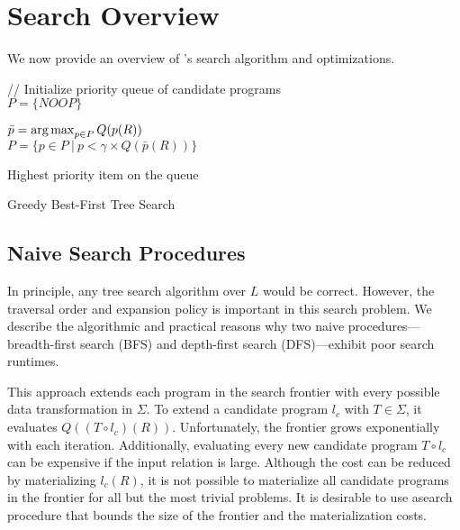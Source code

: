 \section{Search Overview}
We now provide an overview of \sys's search algorithm and optimizations.


{
\begin{algorithm}[t]

// Initialize priority queue of candidate programs\\
$P = \{NOOP\}$

{
    
    $\bar{p} = \operatorname*{arg\,max}_{p\in P} Q(p(R))$\\
    $P = \{p \in P\ |\ p < \gamma\times Q(\bar{p}(R)) \}$
}

\Return Highest priority item on the queue
\caption{Greedy Best-First Tree Search}
\label{alg:main}
\end{algorithm}
}

\subsection{Naive Search Procedures}
In principle, any tree search algorithm over $L$ would be correct.
However, the traversal order and expansion policy is important in this search problem.  We describe the algorithmic and practical reasons why two naive procedures---breadth-first search (BFS) and depth-first search (DFS)---exhibit poor search runtimes.

 This approach extends each program in the search frontier with every possible data transformation in $\Sigma$.  To extend a candidate program $l_c$ with $T \in \Sigma$, it evaluates $Q((T\circ l_c)(R))$.  Unfortunately, the frontier grows exponentially with each iteration.  Additionally, evaluating every new candidate program $T\circ l_c$ can be expensive if the input relation is large.   Although the cost can be reduced by materializing $l_c(R)$, it is not possible to materialize all candidate programs in the frontier for all but the most trivial problems.    It is desirable to use asearch procedure that bounds the size of the frontier and the materialization costs.

